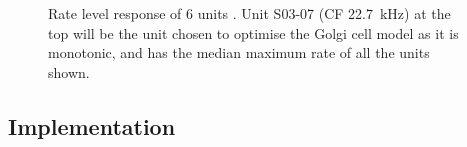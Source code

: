  \begin{figure}[htp!]
   \centering
  \caption{Rate level response of 6 units \citep[from Fig.~2]{GhoshalKim:1997}. Unit S03-07 (CF 22.7~kHz) at the top will be the unit chosen to optimise the Golgi cell model as it is monotonic, and has the median maximum rate of all the units shown.}\label{fig:GolgiKimFig2}
\end{figure}

 \subsection{Implementation}

